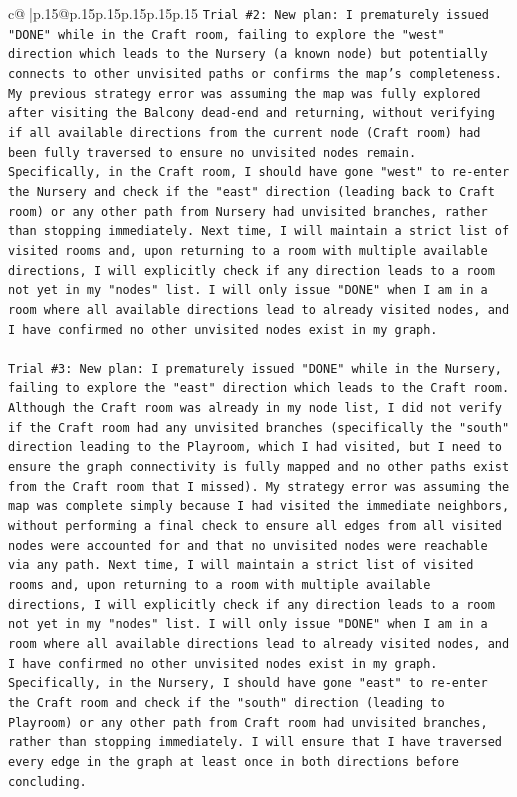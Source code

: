 \documentclass{article}
\begin{document}
{\begin{supertabular}{c@{$\;$}|p{.15\linewidth}@{}p{.15\linewidth}p{.15\linewidth}p{.15\linewidth}p{.15\linewidth}p{.15\linewidth}}
{{{\texttt{Trial \#2: New plan: I prematurely issued "DONE" while in the Craft room, failing to explore the "west" direction which leads to the Nursery (a known node) but potentially connects to other unvisited paths or confirms the map's completeness. My previous strategy error was assuming the map was fully explored after visiting the Balcony dead{-}end and returning, without verifying if all available directions from the current node (Craft room) had been fully traversed to ensure no unvisited nodes remain. Specifically, in the Craft room, I should have gone "west" to re{-}enter the Nursery and check if the "east" direction (leading back to Craft room) or any other path from Nursery had unvisited branches, rather than stopping immediately. Next time, I will maintain a strict list of visited rooms and, upon returning to a room with multiple available directions, I will explicitly check if any direction leads to a room not yet in my "nodes" list. I will only issue "DONE" when I am in a room where all available directions lead to already visited nodes, and I have confirmed no other unvisited nodes exist in my graph.} \\
\\ 
\texttt{Trial \#3: New plan: I prematurely issued "DONE" while in the Nursery, failing to explore the "east" direction which leads to the Craft room. Although the Craft room was already in my node list, I did not verify if the Craft room had any unvisited branches (specifically the "south" direction leading to the Playroom, which I had visited, but I need to ensure the graph connectivity is fully mapped and no other paths exist from the Craft room that I missed). My strategy error was assuming the map was complete simply because I had visited the immediate neighbors, without performing a final check to ensure all edges from all visited nodes were accounted for and that no unvisited nodes were reachable via any path. Next time, I will maintain a strict list of visited rooms and, upon returning to a room with multiple available directions, I will explicitly check if any direction leads to a room not yet in my "nodes" list. I will only issue "DONE" when I am in a room where all available directions lead to already visited nodes, and I have confirmed no other unvisited nodes exist in my graph. Specifically, in the Nursery, I should have gone "east" to re{-}enter the Craft room and check if the "south" direction (leading to Playroom) or any other path from Craft room had unvisited branches, rather than stopping immediately. I will ensure that I have traversed every edge in the graph at least once in both directions before concluding.} \\
}}}
\end{supertabular}}
\end{document}
